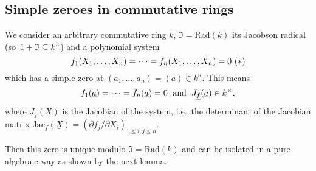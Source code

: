 \documentclass[11pt,a4paper,twoside]{article}
\newcommand \und[1]{\underline{#1}}
\newcommand{\gothic}{\mathfrak}
\newcommand{\fI}{{\gothic I}}
\newcommand{\Jac}{\mathrm{Jac}}
\begin{document}
\subsection{Simple zeroes in commutative rings}

 We consider an arbitrary commutative ring $k$,  $\fI= \mathrm{Rad}(k)$ its Jacobson radical (so\ $1+\fI\subseteq k^{\times}$) and a polynomial
system
$$
f_1(X_1,\dots,X_n) = \cdots = f_n(X_1,\dots,X_n) = 0 ~\relax{(*)}
$$
which has a simple zero at $(a_1,\dots,a_n)=(\und a)\in k^n$. 
This means 
$$
f_1(\und a)= \cdots = f_n(\und a)= 0\;\hbox{ and }\; J_{\und f}(\und a)\in k^{\times },
$$ 
where $J_{\und f}(\und X)$ is the Jacobian of the system,
i.e.\ the determinant of the Jacobian matrix $\Jac_{\und f}(\und X)=(\partial f_j/\partial X_i)_{1\leq i,j\leq n}$.


Then this zero is unique modulo $\fI= \mathrm{Rad}(k)$ and 
can be isolated in a pure algebraic way as shown by the next lemma.
\end{document}
